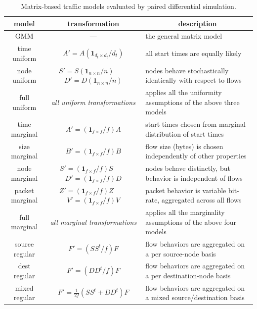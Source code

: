 \documentclass[twocolumn,final]{svjour3}
\newcommand{\ones}[1]{\mathbf{1}_{#1}}
\begin{document}

\begin{table}
\begin{center}
\small
\begin{tabular}{|c|c|l|}
\multicolumn{1}{c}{\textbf{model}} &
\multicolumn{1}{c}{\textbf{transformation}} &
\multicolumn{1}{c}{\textbf{description}} \\
\hline
{\footnotesize{GMM}} & --- & the general matrix model \\\hline\hline
time uniform & $A'=A(\ones{d_t \times d_t}/d_t)$ & all start times are equally likely \\\hline
node uniform & $S'=S(\ones{n \times n}/n)$~~~~$D'=D(\ones{n \times n}/n)$ & nodes behave stochastically identically with respect to flows \\\hline
full uniform & \textit{all uniform transformations} & applies all the uniformity assumptions of the above three models \\\hline\hline
time marginal & $A'=(\ones{f \times f}/f)A$ & start times chosen from marginal distribution of start times \\\hline
size marginal & $B'=(\ones{f \times f}/f)B$ & flow size (bytes) is chosen independently of other properties \\\hline
node marginal & $S'=(\ones{f \times f}/f)S$~~~~$D'=(\ones{f \times f}/f)D$ & nodes behave distinctly, but behavior is independent of flows \\\hline
packet marginal & $Z'=(\ones{f \times f}/f)Z$~~~~$V'=(\ones{f \times f}/f)V$ & packet behavior is variable bit-rate, aggregated across all flows \\\hline
full marginal & \textit{all marginal transformations} & applies all the marginality assumptions of the above four models \\\hline\hline
source regular & $F'=(SS^t/f)F$ & flow behaviors are aggregated on a per source-node basis \\\hline
dest regular & $F'=(DD^t/f)F$ & flow behaviors are aggregated on a per destination-node basis \\\hline
mixed regular & $F'=\frac{1}{2f}(SS^t+DD^t)F$ & flow behaviors are aggregated on a mixed source/destination basis \\\hline
\end{tabular}
\caption{Matrix-based traffic models evaluated by paired differential simulation.}
\label{tab:traffic-models}
\end{center}
\vspace{-2em}
\end{table}
\end{document}
